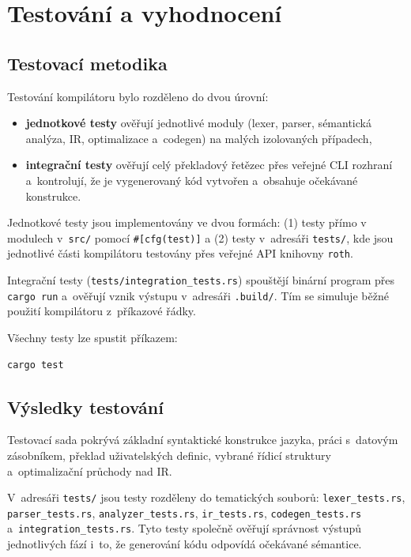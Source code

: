 \section{Testování a vyhodnocení}
\label{sec:testovani}

\subsection{Testovací metodika}

Testování kompilátoru bylo rozděleno do dvou úrovní:
\begin{itemize}
	\item \textbf{jednotkové testy} ověřují jednotlivé moduly (lexer, parser,
	      sémantická analýza, IR, optimalizace a~codegen) na malých izolovaných
	      případech,
	\item \textbf{integrační testy} ověřují celý překladový řetězec přes
	      veřejné CLI rozhraní a~kontrolují, že je vygenerovaný kód vytvořen
	      a~obsahuje očekávané konstrukce.
\end{itemize}

Jednotkové testy jsou implementovány ve dvou formách:
(1) testy přímo v modulech v~\texttt{src/} pomocí \texttt{\#[cfg(test)]} a
(2) testy v~adresáři \texttt{tests/}, kde jsou jednotlivé části kompilátoru
testovány přes veřejné API knihovny \texttt{roth}.

Integrační testy (\texttt{tests/integration\_tests.rs}) spouštějí binární
program přes \texttt{cargo run} a~ověřují vznik výstupu v~adresáři \texttt{.build/}.
Tím se simuluje běžné použití kompilátoru z~příkazové řádky.

Všechny testy lze spustit příkazem:
\begin{lstlisting}[language=bash, caption={Spuštění testů}]
cargo test
\end{lstlisting}

\subsection{Výsledky testování}

Testovací sada pokrývá základní syntaktické konstrukce jazyka, práci s~datovým
zásobníkem, překlad uživatelských definic, vybrané řídicí struktury a~optimalizační
průchody nad IR.

V~adresáři \texttt{tests/} jsou testy rozděleny do tematických souborů:
\texttt{lexer\_tests.rs}, \texttt{parser\_tests.rs}, \texttt{analyzer\_tests.rs},
\texttt{ir\_tests.rs}, \texttt{codegen\_tests.rs} a~\texttt{integration\_tests.rs}.
Tyto testy společně ověřují správnost výstupů jednotlivých fází i~to, že
generování kódu odpovídá očekávané sémantice.

